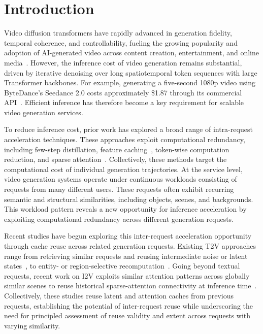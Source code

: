 \section{Introduction}
Video diffusion transformers have rapidly advanced in generation fidelity, temporal coherence, and controllability, fueling the growing popularity and adoption of AI-generated video across content creation, entertainment, and online media~\citep{team2025wan,kong2024hunyuanvideo,yang2025cogvideox}.
However, the inference cost of video generation remains substantial, driven by iterative denoising over long spatiotemporal token sequences with large Transformer backbones.
For example, generating a five-second 1080p video using ByteDance's Seedance 2.0 costs approximately \$1.87 through its commercial API~\citep{byteplus2026seedance2}.
Efficient inference has therefore become a key requirement for scalable video generation services.

To reduce inference cost, prior work has explored a broad range of intra-request acceleration techniques.
These approaches exploit computational redundancy, including few-step distillation, feature caching~\citep{nie2026transition, lyu2025fastercache}, token-wise computation reduction, and sparse attention~\citep{zou2024accelerating, chen2026sparse}.
Collectively, these methods target the computational cost of individual generation trajectories.
At the service level, video generation systems operate under continuous workloads consisting of requests from many different users.
These requests often exhibit recurring semantic and structural similarities, including objects, scenes, and backgrounds.
This workload pattern reveals a new opportunity for inference acceleration by exploiting computational redundancy across different generation requests. 

Recent studies have begun exploring this inter-request acceleration opportunity through cache reuse across related generation requests.
Existing T2V approaches range from retrieving similar requests and reusing intermediate noise or latent states~\citep{cherian2026chai}, to entity- or region-selective recomputation~\citep{liu2026beyond}.
Going beyond textual requests, recent work on I2V exploits similar attention patterns across globally similar scenes to reuse historical sparse-attention connectivity at inference time~\citep{liu2026chorus}.
Collectively, these studies reuse latent and attention caches from previous requests, establishing the potential of inter-request reuse while underscoring the need for principled assessment of reuse validity and extent across requests with varying similarity.

